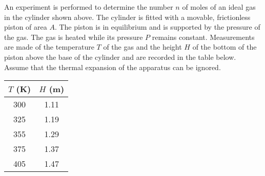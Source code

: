 \documentclass{../../../oss-ap12ibhl}
\begin{document}
\begin{questions}
  \newpage
  
  
  \question An experiment is performed to determine the number $n$ of moles of
  an ideal gas in the cylinder shown above. The cylinder is fitted with a
  movable, frictionless piston of area $A$. The piston is in equilibrium and is
  supported by the pressure of the gas. The gas is heated while its pressure
  $P$ remains constant. Measurements are made of the temperature $T$ of the gas
  and the height $H$ of the bottom of the piston above the base of the cylinder
  and are recorded in the table below. Assume that the thermal expansion of the
  apparatus can be ignored.
  \begin{center}
    \begin{tabular}{|c|c|}
      \hline
      $T$ (\si{\kelvin}) & $H$ (\si{\metre}) \\ \hline\hline
      300 & 1.11 \\
      325 & 1.19 \\
      355 & 1.29 \\
      375 & 1.37 \\
      405 & 1.47 \\
      \hline
    \end{tabular}
  \end{center}
\end{questions}
\end{document}
